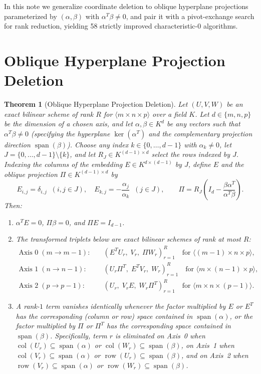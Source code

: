 \documentclass[11pt,a4paper]{article}
\newtheorem{theorem}{Theorem}
\begin{document}
In this note we generalize coordinate deletion to oblique hyperplane projections parameterized by $(\alpha, \beta)$ with $\alpha^T \beta \neq 0$, and pair it with a pivot-exchange search for rank reduction, yielding 58 strictly improved characteristic-$0$ algorithms.

\section{Oblique Hyperplane Projection Deletion}
\begin{theorem}[Oblique Hyperplane Projection Deletion]
Let $(U, V, W)$ be an exact bilinear scheme of rank $R$ for $\langle m\times n\times p\rangle$ over a field $K$. Let $d \in \{m,n,p\}$ be the dimension of a chosen axis, and let $\alpha, \beta \in K^d$ be any vectors such that $\alpha^T \beta \neq 0$ (specifying the hyperplane $\ker(\alpha^T)$ and the complementary projection direction $\operatorname{span}(\beta)$). Choose any index $k \in \{0,\dots,d-1\}$ with $\alpha_k \neq 0$, let $J = \{0,\dots,d-1\}\setminus\{k\}$, and let $R_J \in K^{(d-1)\times d}$ select the rows indexed by $J$. Indexing the columns of the embedding $E \in K^{d\times (d-1)}$ by $J$, define $E$ and the oblique projection $\Pi \in K^{(d-1)\times d}$ by
\begin{equation}
E_{i,j} = \delta_{i,j} \;\; (i,j \in J), \quad E_{k,j} = -\frac{\alpha_j}{\alpha_k}\;\; (j \in J),
\qquad
\Pi = R_J\!\left(I_d - \frac{\beta \alpha^T}{\alpha^T \beta}\right).
\end{equation}
Then:
\begin{enumerate}
\item $\alpha^T E = 0$, $\Pi \beta = 0$, and $\Pi E = I_{d-1}$.
\item The transformed triplets below are exact bilinear schemes of rank at most $R$:
\begin{align*}
\text{Axis } 0\;(m\to m-1): &\quad (E^T U_r,\; V_r,\; \Pi W_r)_{r=1}^R \quad \text{for } \langle (m-1)\times n\times p\rangle, \\
\text{Axis } 1\;(n\to n-1): &\quad (U_r \Pi^T,\; E^T V_r,\; W_r)_{r=1}^R \quad \text{for } \langle m\times (n-1)\times p\rangle, \\
\text{Axis } 2\;(p\to p-1): &\quad (U_r,\; V_r E,\; W_r \Pi^T)_{r=1}^R \quad \text{for } \langle m\times n\times (p-1)\rangle.
\end{align*}
\item A rank-$1$ term vanishes identically whenever the factor multiplied by $E$ or $E^T$ has the corresponding (column or row) space contained in $\operatorname{span}(\alpha)$, or the factor multiplied by $\Pi$ or $\Pi^T$ has the corresponding space contained in $\operatorname{span}(\beta)$. Specifically, term $r$ is eliminated on Axis~0 when $\operatorname{col}(U_r)\subseteq\operatorname{span}(\alpha)$ or $\operatorname{col}(W_r)\subseteq\operatorname{span}(\beta)$, on Axis~1 when $\operatorname{col}(V_r)\subseteq\operatorname{span}(\alpha)$ or $\operatorname{row}(U_r)\subseteq\operatorname{span}(\beta)$, and on Axis~2 when $\operatorname{row}(V_r)\subseteq\operatorname{span}(\alpha)$ or $\operatorname{row}(W_r)\subseteq\operatorname{span}(\beta)$.

\end{enumerate}
\end{theorem}
\end{document}
